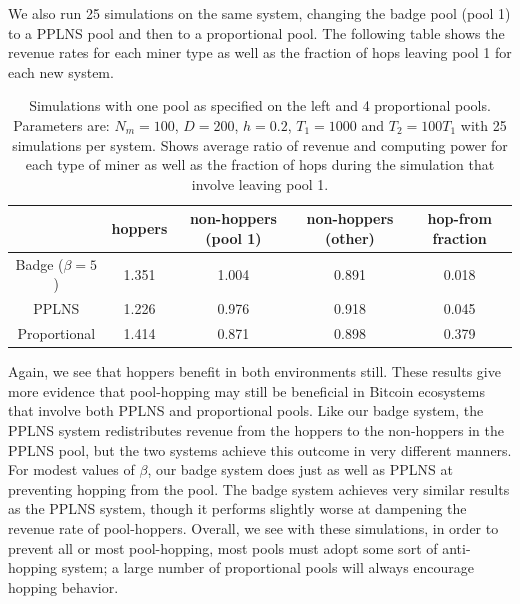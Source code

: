\documentclass{article}
\theoremstyle{plain}
\theoremstyle{definition}
\begin{document}
We also run 25 simulations on the same system, changing the badge pool (pool 1) to a PPLNS pool and then to a proportional pool. The following table shows the revenue rates for each miner type as well as the fraction of hops leaving pool 1 for each new system.

\begin{table}
\begin{center}
\begin{tabular}{ |c|c|c|c|c| } 
 \hline
 & hoppers & non-hoppers (pool 1) & non-hoppers (other) & hop-from fraction \\ 
 \hline
 Badge ($\beta = 5$) & 1.351 & 1.004 & 0.891 & 0.018 \\
 \hline
 PPLNS & 1.226 & 0.976 & 0.918 & 0.045 \\ 
 \hline
 Proportional & 1.414 & 0.871 & 0.898 & 0.379\\ 
 \hline
\end{tabular}
\end{center}
\caption{Simulations with one pool as specified on the left and 4 proportional pools. Parameters are: $N_m = 100$, $D = 200$, $h = 0.2$, $T_1 = 1000$ and $T_2 = 100T_1$ with 25 simulations per system. Shows average ratio of revenue and computing power for each type of miner as well as the fraction of hops during the simulation that involve leaving pool 1.}
\end{table}
Again, we see that hoppers benefit in both environments still. These results give more evidence that pool-hopping may still be beneficial in Bitcoin ecosystems that involve both PPLNS and proportional pools. Like our badge system, the PPLNS system redistributes revenue from the hoppers to the non-hoppers in the PPLNS pool, but the two systems achieve this outcome in very different manners. For modest values of $\beta$, our badge system does just as well as PPLNS at preventing hopping from the pool. The badge system achieves very similar results as the PPLNS system, though it performs slightly worse at dampening the revenue rate of pool-hoppers. Overall, we see with these simulations, in order to prevent all or most pool-hopping, most pools must adopt some sort of anti-hopping system; a large number of proportional pools will always encourage hopping behavior. 
\end{document}

